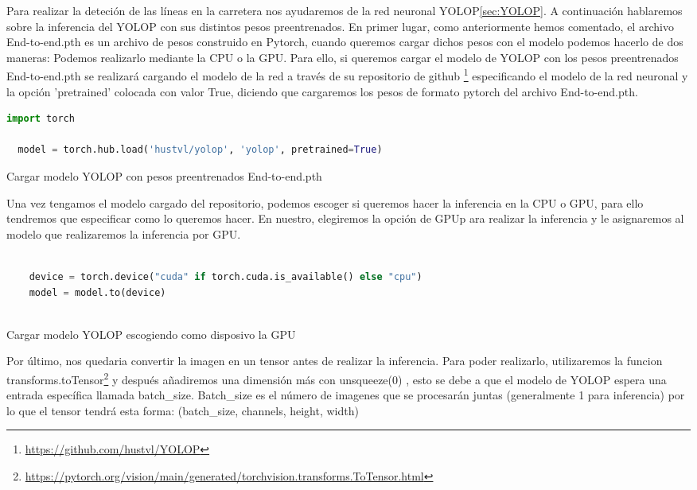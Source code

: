 Para realizar la deteción de las líneas en la carretera nos ayudaremos de la red neuronal YOLOP\ref{sec:YOLOP}. A continuación hablaremos sobre la inferencia del YOLOP con sus distintos pesos preentrenados. En primer lugar, 
como anteriormente hemos comentado, el archivo End-to-end.pth es un archivo de pesos construido en Pytorch, cuando queremos cargar
dichos pesos con el modelo podemos hacerlo de dos maneras: Podemos realizarlo mediante la CPU o la GPU. 
Para ello, si queremos cargar el modelo de YOLOP con los pesos preentrenados End-to-end.pth se realizará cargando el modelo de la red a través de su repositorio de github \footnote{\url{https://github.com/hustvl/YOLOP}}
especificando el modelo de la red neuronal y la opción 'pretrained' colocada con valor True, diciendo que cargaremos los pesos de formato pytorch del archivo End-to-end.pth.\newline
\begin{code}[h]
  \begin{lstlisting}[language=Python]
  import torch
  
  model = torch.hub.load('hustvl/yolop', 'yolop', pretrained=True)

  \end{lstlisting}
  \caption[Cargar modelo YOLOP con pesos preentrenados End-to-end.pth]{Cargar modelo YOLOP con pesos preentrenados End-to-end.pth}
  \label{cod:codejemplo}
  \end{code}  

Una vez tengamos el modelo cargado del repositorio, podemos escoger si queremos hacer la inferencia en la CPU o GPU, para ello tendremos que especificar como 
lo queremos hacer. En nuestro, elegiremos la opción de GPUp ara realizar la inferencia y le asignaremos al modelo que realizaremos la inferencia por GPU.\newline

  
  \begin{code}[h]
    \begin{lstlisting}[language=Python]
   
    device = torch.device("cuda" if torch.cuda.is_available() else "cpu")
    model = model.to(device)
  
    \end{lstlisting}
    \caption[Cargar modelo YOLOP escogiendo como disposivo la GPU]{Cargar modelo YOLOP escogiendo como disposivo la GPU}
    \label{cod:codeloadYOLOP}
    \end{code}  

    Por último, nos quedaria convertir la imagen en un tensor antes de realizar la inferencia. Para poder realizarlo, utilizaremos la funcion transforms.toTensor\footnote{\url{https://pytorch.org/vision/main/generated/torchvision.transforms.ToTensor.html}} 
    y después añadiremos una dimensión más con unsqueeze(0) , esto se debe 
    a que el modelo de YOLOP espera una entrada específica llamada batch\_size. Batch\_size es el número de imagenes que se procesarán juntas
    (generalmente 1 para inferencia) por lo que el tensor tendrá esta forma: (batch\_size, channels, height, width)\newline

